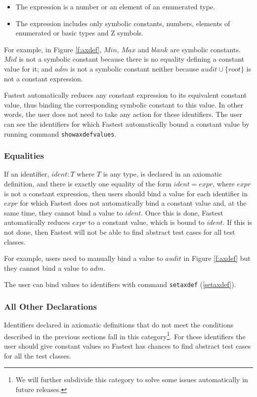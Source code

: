 \begin{itemize}
\item The expression is a number or an element of an enumerated type.

\item The expression includes only symbolic constants, numbers, elements of enumerated or basic types and Z symbols.
\end{itemize}

For example, in Figure \ref{f:axdef}, $Min$, $Max$ and $blank$  are symbolic constants. $Mid$ is not a symbolic constant because there is no equality defining a constant value for it; and $adm$  is not a symbolic constant neither because $audit \cup \{root\}$ is not a constant expression. 

Fastest automatically reduces any constant expression to its equivalent constant value, thus binding the corresponding symbolic constant to this value. In other words, the user does not need to take any action for these identifiers. The user can see the identifiers for which Fastest automatically bound a constant value by running  command \verb+showaxdefvalues+.


\subsubsection{\label{equalities}Equalities}
If an identifier, $ident:T$ where $T$ is any type, is declared in an axiomatic definition, and there is exactly one equality of the form $ident = expr$, where $expr$ is not a constant expression, then users should bind a value for each identifier in $expr$ for which Fastest does not automatically bind a constant value and, at the same time, they cannot bind a value to $ident$. Once this is done, Fastest automatically reduces $expr$ to a constant value, which is bound to $ident$. If this is not done, then Fastest will not be able to find abstract test cases for all test classes.

For example, users need to manually bind a value to $audit$ in Figure \ref{f:axdef} but they cannot bind a value to $adm$.

The user can bind values to identifiers with command \verb+setaxdef+ (\ref{setaxdef}).
 
\subsubsection{All Other Declarations}
Identifiers declared in axiomatic definitions that do not meet the conditions described in the previous sections fall in this category\footnote{We will further subdivide this category to solve some issues automatically in future releases.}. For these identifiers the user should give constant values so Fastest has chances to find abstract test cases for all the test classes. 

